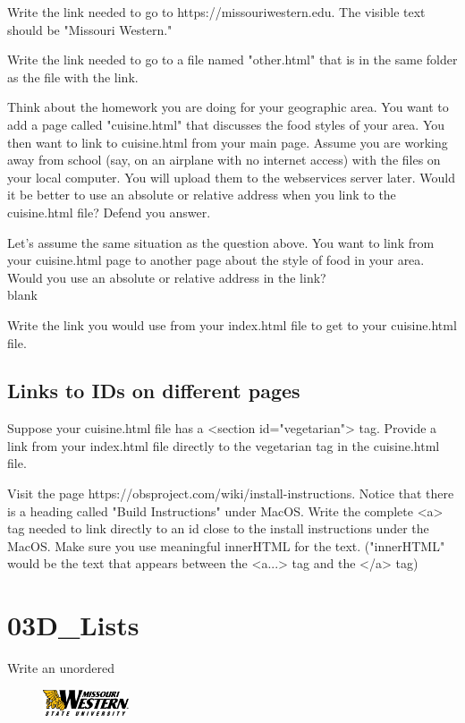 \documentclass[letterpaper,12pt]{exam}
\begin{document}
\begin{questions}
\question Write the link needed to go to https://missouriwestern.edu.  The visible text should be "Missouri Western." 
\vspace{10mm}

\question Write the link needed to go to a file named "other.html" that is in the same folder as the file with the link. 
\vspace{10mm}

\question Think about the homework you are doing for your geographic area.  You want to add a page called "cuisine.html" 
that discusses the food styles of your area.  You then want to link to cuisine.html from your main page.  Assume you are working away from school (say, on an airplane with no internet access) with the files on your local computer.  You will upload them to the webservices server later. 
Would it be better to use an absolute or relative address when you link to the cuisine.html file?  Defend you answer.
\vspace{15mm}

\question Let's assume the same situation as the question above.  You want to link from your cuisine.html page to another page about the style of food in your area.  Would you use an absolute or relative address in the link? \\blank\blank 
\vspace{2mm}

\question Write the link you would use from your index.html file to get to your cuisine.html file.
\vspace{10mm}

\begin{samepage}
\subsection*{Links to IDs on different pages}

\question Suppose your cuisine.html file has a <section id="vegetarian"> tag.  Provide a link from your index.html file directly to the vegetarian tag in the cuisine.html file. 
\vspace{10mm}
\end{samepage}

\question Visit the page https://obsproject.com/wiki/install-instructions.  Notice that there is a heading called "Build Instructions" under MacOS.  
Write the complete <a> tag needed to link directly to an id close to the install instructions under the MacOS.  Make sure you use meaningful innerHTML for the text. ("innerHTML" would be the text that appears between the <a...> tag and the </a> tag)
\vspace{10mm}

\section*{03D\_Lists}
Write an unordered 

\end{questions}

\begin{figure}[b]\label{end}
	\center
	\includegraphics[width=1in]{tux}
\end{figure}
\end{document}
